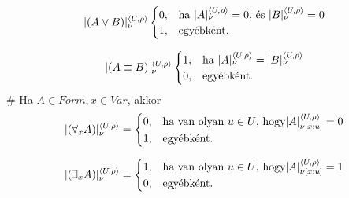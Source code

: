 \begin{definition}
\begin{easylist}
			\begin{equation}
				|(A\lor B)|^{\langle U, \rho \rangle}_{\nu}
				\begin{cases}
				0, & \text{ha $|A|^{\langle U, \rho \rangle}_{\nu} = 0$, és $|B|^{\langle U, \rho \rangle}_{\nu} = 0$}\\
				1, & \text{egyébként.}
				\end{cases}
			\end{equation}
			
			\begin{equation}
				|(A\equiv B)|^{\langle U, \rho \rangle}_{\nu}
				\begin{cases}
				1, & \text{ha $|A|^{\langle U, \rho \rangle}_{\nu} = |B|^{\langle U, \rho \rangle}_{\nu}$}\\
				0, & \text{egyébként.}
				\end{cases}
			\end{equation}
		# Ha $A \in Form, x \in Var$, akkor
			\begin{equation}
				|(\forall_x A)|^{\langle U, \rho \rangle}_{\nu} =
				\begin{cases}
				0, & \text{ha van olyan $u \in U$, hogy$|A|^{\langle U, \rho \rangle}_{\nu [x:u]} = 0$}\\
				1, & \text{egyébként.}
				\end{cases}
			\end{equation}
			
			\begin{equation}
				|(\exists_x A)|^{\langle U, \rho \rangle}_{\nu} =
				\begin{cases}
				1, & \text{ha van olyan $u \in U$, hogy$|A|^{\langle U, \rho \rangle}_{\nu [x:u]} = 1$}\\
				0, & \text{egyébként.}
				\end{cases}
			\end{equation}
	\end{easylist}
\end{definition}

